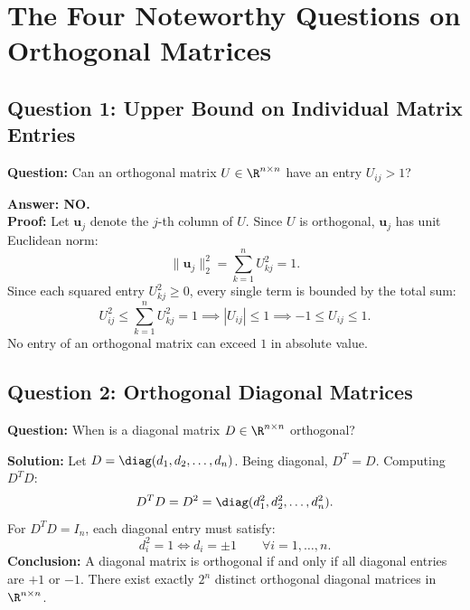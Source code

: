 \FloatBarrier
\section{The Four Noteworthy Questions on Orthogonal Matrices}

\subsection{Question 1: Upper Bound on Individual Matrix Entries}

\begin{example}
\textbf{Question:} Can an orthogonal matrix $U \in \R^{n \times n}$ have an entry $U_{ij} > 1$?

\textbf{Answer: NO.} \\
\textbf{Proof:} Let $\mathbf{u}_j$ denote the $j$-th column of $U$. Since $U$ is orthogonal, $\mathbf{u}_j$ has unit Euclidean norm:
\begin{equation}
    \|\mathbf{u}_j\|_2^2 = \sum_{k=1}^n U_{kj}^2 = 1.
\end{equation}
Since each squared entry $U_{kj}^2 \ge 0$, every single term is bounded by the total sum:
\begin{equation}
    U_{ij}^2 \le \sum_{k=1}^n U_{kj}^2 = 1 \implies |U_{ij}| \le 1 \implies -1 \le U_{ij} \le 1.
\end{equation}
No entry of an orthogonal matrix can exceed $1$ in absolute value.
\end{example}

\subsection{Question 2: Orthogonal Diagonal Matrices}

\begin{example}
\textbf{Question:} When is a diagonal matrix $D \in \R^{n \times n}$ orthogonal?

\textbf{Solution:} Let $D = \diag(d_1, d_2, \dots, d_n)$. Being diagonal, $D^T = D$. Computing $D^T D$:
\begin{equation}
    D^T D = D^2 = \diag(d_1^2, d_2^2, \dots, d_n^2).
\end{equation}
For $D^T D = I_n$, each diagonal entry must satisfy:
\begin{equation}
    d_i^2 = 1 \iff d_i = \pm 1 \qquad \forall i = 1, \dots, n.
\end{equation}
\textbf{Conclusion:} A diagonal matrix is orthogonal if and only if all diagonal entries are $+1$ or $-1$. There exist exactly $2^n$ distinct orthogonal diagonal matrices in $\R^{n \times n}$.
\end{example}

